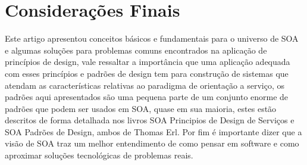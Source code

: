 \documentclass[12pt]{article}
\begin{document}
\section{Considerações Finais}

Este artigo apresentou conceitos básicos e fundamentais para o universo de SOA e algumas soluções para problemas comuns encontrados na aplicação de princípios de design, vale ressaltar a importância que uma aplicação adequada com esses princípios e padrões de design tem para construção de sistemas que atendam as características relativas ao paradigma de orientação a serviço, os padrões aqui apresentados são uma pequena parte de um conjunto enorme de padrões que podem ser usados em SOA, quase em sua maioria, estes estão descritos de forma detalhada nos livros SOA Principios de Design de Serviços e SOA Padrões de Design, ambos de Thomas Erl. Por fim é importante dizer que a visão de SOA traz um melhor entendimento de como pensar em software e como aproximar soluções tecnológicas de problemas reais.

\nocite{daigneau}
\nocite{gartner}
\nocite{erl_principio}
\nocite{dev1}
\nocite{dev2}
\nocite{baccaro}
\nocite{wiki}
\nocite{soa_patterns}



\end{document}
